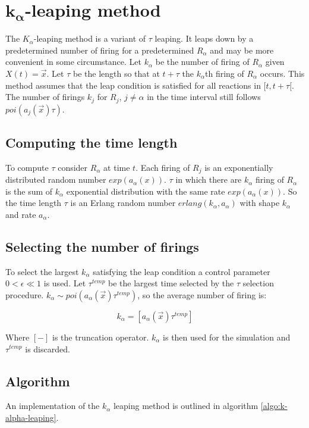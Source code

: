 \section{$\mathbf{k_\alpha}$-leaping method}
The $K_\alpha$-leaping method is a variant of $\tau$ leaping.
It leaps down by a predetermined number of firing for a predetermined $R_\alpha$ and may be more convenient in some circumstance.
Let $k_\alpha$ be the number of firing of $R_\alpha$ given $X(t) =\vec{x}$.
Let $\tau$ be the length so that at $t+\tau$ the $k_\alpha$th firing of $R_\alpha$ occurs.
This method assumes that the leap condition is satisfied for all reactions in $[t,t+\tau[$.
The number of firings $k_j$ for $R_j$, $j\neq\alpha$ in the time interval still follows $poi(a_j(\vec{x})\tau)$.

  \subsection{Computing the time length}
  To compute $\tau$ consider $R_\alpha$ at time $t$.
  Each firing of $R_j$ is an exponentially distributed random number $exp(a_\alpha(x))$.
  $\tau$ in which there are $k_\alpha$ firing of  $R_\alpha$ is the sum of $k_\alpha$ exponential distribution with the same rate $exp(a_\alpha(x))$.
  So the time length $\tau$ is an Erlang random number $erlang(k_\alpha, a_\alpha)$ with shape $k_\alpha$ and rate $a_\alpha$.

  \subsection{Selecting the number of firings}
  To select the largest $k_\alpha$ satisfying the leap condition a control parameter $0<\epsilon\ll 1$ is used.
  Let $\tau^{temp}$ be the largest time selected by the $\tau$ selection procedure.
  $k_\alpha\sim poi(a_\alpha(\vec{x})\tau^{temp})$, so the average number of firing is:

  $$k_\alpha = [a_\alpha(\vec{x})\tau^{temp}]$$

  Where $[-]$ is the truncation operator.
  $k_\alpha$ is then used for the simulation and $\tau^{temp}$ is discarded.

  \subsection{Algorithm}
  An implementation of the $k_\alpha$ leaping method is outlined in algorithm \ref{algo:k-alpha-leaping}.

  

